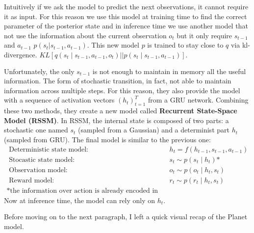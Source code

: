 Intuitively if we ask the model to predict the next observations, it cannot require it as input.
For this reason we use this model at training time to find the correct parameter of the posterior state and in inference time we use another model that not use the information about the current observation $o_t$ but  it only require $s_{t-1}$ and $a_{t-1}$ $p(s_t | s_{t-1}, a_{t-1})$.
This new model $p$ is trained to stay close to $q$ via kl-divergence.
$KL\left[ q\left(s_{t} \mid s_{t-1}, a_{t-1}, o_{t}\right) || p\left(s_{t} \mid s_{t-1}, a_{t-1}\right)  \right]$.

Unfortunately, the only $s_{t-1}$ is not enough to maintain in memory all the useful information.
The form of stochastic transition, in fact, not able to maintain information across multiple steps.
For this reason, they also provide the model with a sequence of activation vectors $\left( h_t \right) ^{T}_{t=1}$ from a GRU network.
Combining these two methods, they create a new model called \textbf{Recurrent State-Space Model (RSSM)}.
In RSSM, the internal state is composed of two parts: a stochastic one named $s_t$ (sampled from a Gaussian) and a determinist part $h_t$ (sampled from GRU).
The final model is similar to the previous one:
\begin{align*}
\text { Deterministic state model: } & h_{t} = f\left(h_{t-1} , s_{t-1}, a_{t-1}\right) \\
\text { Stocastic state  model: } & s_{t} \sim p\left(s_{t} \mid h_{t}\right)  \text {*}\\
\text { Observation model: } & o_{t} \sim p\left(o_{t} \mid h_{t}, s_{t}\right) \\
\text { Reward model: } & r_{t} \sim p\left(r_{t} \mid h_{t}, s_{t}\right)\\
\text{*the information over action is already encoded in h}
\end{align*}
Now at inference time, the model can rely only on $h_t$.

Before moving on to the next paragraph, I left a quick visual recap of the Planet model.

